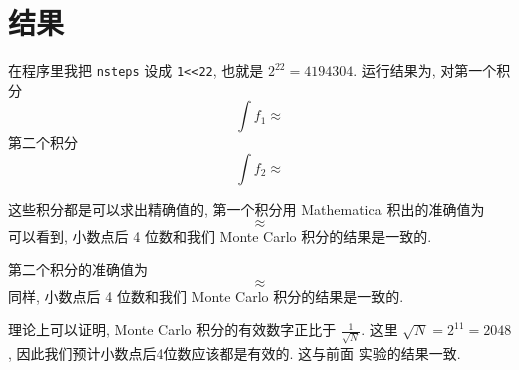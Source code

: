 \documentclass{ctexart}
\begin{document}
\section{结果}
在程序里我把 \verb|nsteps| 设成 \verb|1<<22|, 也就是 $2^{22} = 4194304$.
运行结果为, 对第一个积分
\[
\int f_1 \approx 
\]
第二个积分
\[
\int f_2 \approx 
\]

这些积分都是可以求出精确值的, 第一个积分用 Mathematica 积出的准确值为
\[
 \approx 
\]
可以看到, 小数点后 4 位数和我们 Monte Carlo 积分的结果是一致的.

第二个积分的准确值为
\[
 \approx 
\]
同样, 小数点后 4 位数和我们 Monte Carlo 积分的结果是一致的.

理论上可以证明, Monte Carlo 积分的有效数字正比于 $\frac{1}{\sqrt{N}}$. 这里
$\sqrt{N}=2^{11}=2048$, 因此我们预计小数点后4位数应该都是有效的. 这与前面
实验的结果一致.
\end{document}
